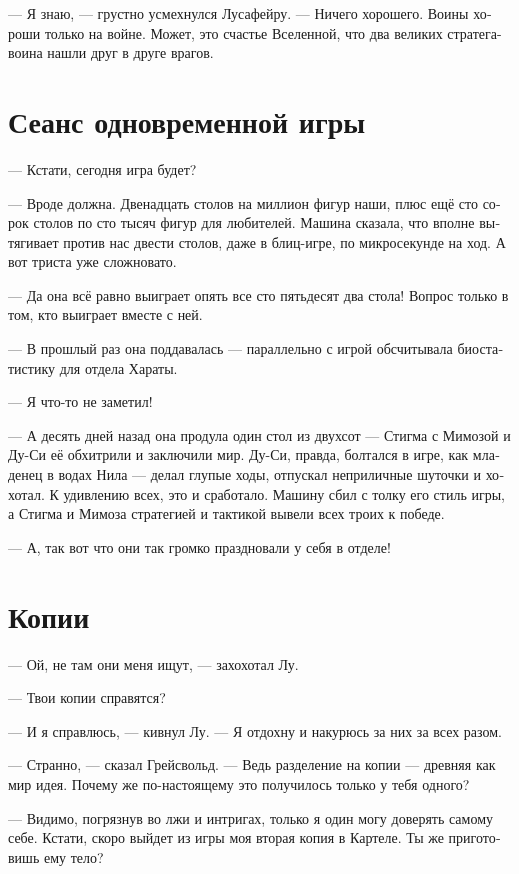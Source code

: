 \documentclass[a4paper,12pt,fleqn]{book}\usepackage{polyglossia}\setdefaultlanguage[babelshorthands=true]{russian}\setotherlanguage{english}\defaultfontfeatures{Ligatures=TeX,Mapping=tex-text}\usepackage{xcolor}\newcommand{\ml}[3]{#2}
\begin{document}
{--- Я знаю, --- грустно усмехнулся Лусафейру.
--- Ничего хорошего.
Воины хороши только на войне.
Может, это счастье Вселенной, что два великих стратега-воина нашли друг в друге врагов.

\section{Сеанс одновременной игры}

--- Кстати, сегодня игра будет?

--- Вроде должна.
Двенадцать столов на миллион фигур наши, плюс ещё сто сорок столов по сто тысяч фигур для любителей.
Машина сказала, что вполне вытягивает против нас двести столов, даже в блиц-игре, по микросекунде на ход.
А вот триста уже сложновато.

--- Да она всё равно выиграет опять все сто пятьдесят два стола!
Вопрос только в том, кто выиграет вместе с ней.

--- В прошлый раз она поддавалась --- параллельно с игрой обсчитывала биостатистику для отдела Хараты.

--- Я что-то не заметил!

--- А десять дней назад она продула один стол из двухсот --- Стигма с Мимозой и Ду-Си её обхитрили и заключили мир.
Ду-Си, правда, болтался в игре, как младенец в водах Нила --- делал глупые ходы, отпускал неприличные шуточки и хохотал.
К удивлению всех, это и сработало.
Машину сбил с толку его стиль игры, а Стигма и Мимоза стратегией и тактикой вывели всех троих к победе.

--- А, так вот что они так громко праздновали у себя в отделе!

\section{Копии}

--- Ой, не там они меня ищут, --- захохотал Лу.

--- Твои копии справятся?

--- И я справлюсь, --- кивнул Лу.
--- Я отдохну и накурюсь за них за всех разом.

--- Странно, --- сказал Грейсвольд.
--- Ведь разделение на копии --- древняя как мир идея.
Почему же по-настоящему это получилось только у тебя одного?

--- Видимо, погрязнув во лжи и интригах, только я один могу доверять самому себе.
Кстати, скоро выйдет из игры моя вторая копия в Картеле.
Ты же приготовишь ему тело?

}
\end{document}
